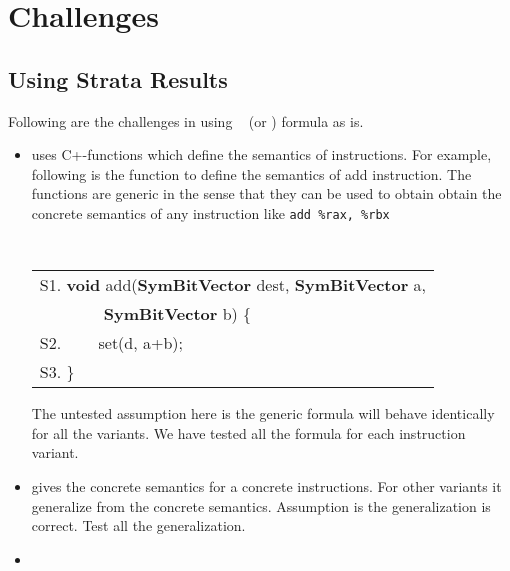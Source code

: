 \section{Challenges}

\subsection{Using Strata Results}
 Following are the challenges in using \Strata{}~\cite{Heule2016a} (or \Stoke{}) 
 formula as is.    
 
\begin{itemize}

  \item

    \Stoke uses C+-functions which define the semantics of instructions. For
    example, following is the function to define the semantics of add
    instruction. The functions are generic in the sense that they can be used to
    obtain obtain the concrete semantics of any instruction like \texttt{add\
      \%rax,\ \%rbx}
  

{\small \tt 
  \begin{tabular}[b]{l}
   S1. {\bf void}  add({\bf SymBitVector} dest, {\bf SymBitVector} a, \\ 
       \ \ \ \ \ \ \ \ {\bf SymBitVector} b) \{ \\ 
   S2. \ \ \ \ set(d, a+b); \\
   S3. \}\\
  \end{tabular}
}

  
  The untested assumption here is the generic formula will behave identically
  for all the variants. We have tested all the formula for each instruction
  variant. 
  
  \item 

  \Strata gives the concrete semantics for a concrete instructions. For other
  variants it generalize from the concrete semantics. Assumption is the
  generalization is correct. Test all the generalization.

  \item 


\end{itemize}
